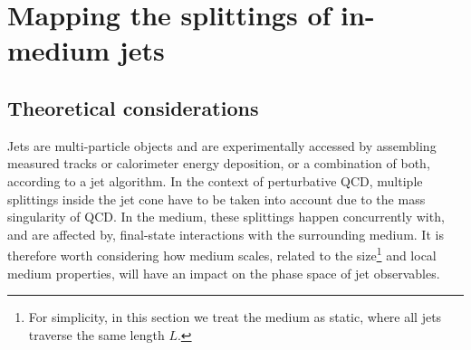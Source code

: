 
\section{Mapping the splittings of in-medium jets}
\label{sec:phasespace}


\subsection{Theoretical considerations}
\label{sec:phasespace-theory}


Jets are multi-particle objects and are experimentally accessed by assembling measured tracks or calorimeter energy deposition, or a combination of both, according to a jet algorithm. In the context of perturbative QCD, multiple splittings inside the jet cone have to be taken into account due to the mass singularity of QCD. 
In the medium, these splittings happen concurrently with, and are affected by, final-state interactions with the surrounding medium. It is therefore worth considering how medium scales, related to the size\footnote{For simplicity, in this section we treat the medium as static, where all jets traverse the same length $L$.} and local medium properties, will have an impact on the phase space of jet observables. 

